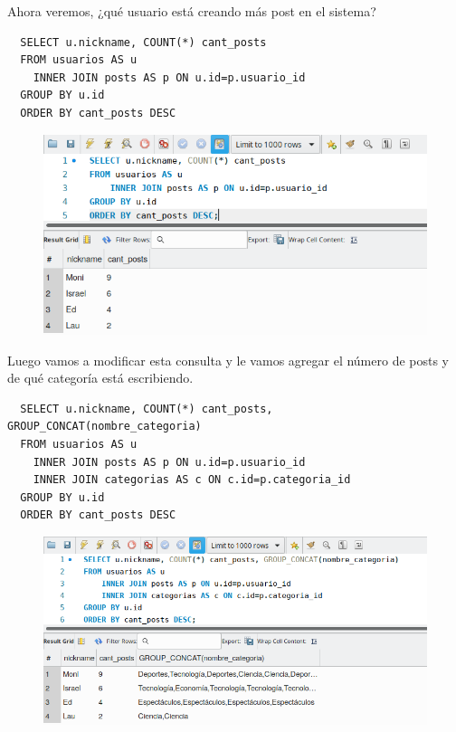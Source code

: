 \documentclass{article}
\begin{document}
Ahora veremos, ¿qué usuario está creando más post en el sistema?\\

\begin{verbatim}
  SELECT u.nickname, COUNT(*) cant_posts
  FROM usuarios AS u
    INNER JOIN posts AS p ON u.id=p.usuario_id
  GROUP BY u.id
  ORDER BY cant_posts DESC
\end{verbatim}

\begin{figure}[h!]
  \centering
  \includegraphics[scale=0.75]{./Pictures/140_sixth_question.png}
\end{figure}


Luego vamos a modificar esta consulta y le vamos agregar el número de posts y
de qué categoría está escribiendo.\\
\begin{verbatim}
  SELECT u.nickname, COUNT(*) cant_posts, GROUP_CONCAT(nombre_categoria)
  FROM usuarios AS u
    INNER JOIN posts AS p ON u.id=p.usuario_id
    INNER JOIN categorias AS c ON c.id=p.categoria_id
  GROUP BY u.id
  ORDER BY cant_posts DESC
\end{verbatim}

\begin{figure}[h!]
  \centering
  \includegraphics[scale=0.75]{./Pictures/141_seventh_question.png}
\end{figure}
\end{document}
